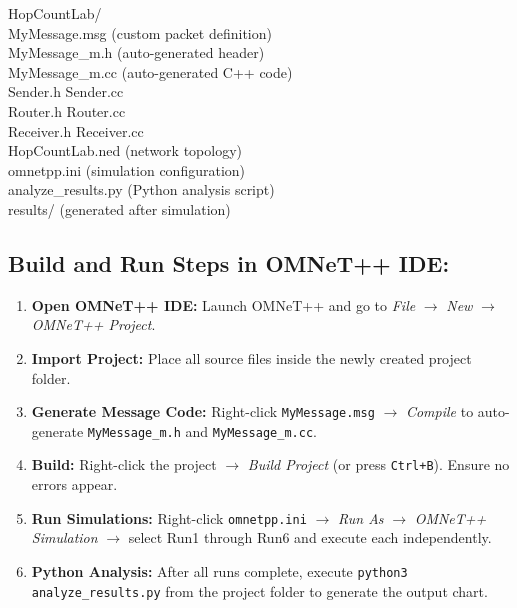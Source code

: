 \documentclass[12pt,a4paper]{article}
\begin{document}
\begin{tcolorbox}[colback=codegray, colframe=gray!50, fontupper=\ttfamily\small]
HopCountLab/ \\
\quad MyMessage.msg \quad\quad (custom packet definition) \\
\quad MyMessage\_m.h \quad\quad (auto-generated header) \\
\quad MyMessage\_m.cc \quad (auto-generated C++ code) \\
\quad Sender.h \quad\quad Sender.cc \\
\quad Router.h \quad\quad Router.cc \\
\quad Receiver.h \quad Receiver.cc \\
\quad HopCountLab.ned \quad (network topology) \\
\quad omnetpp.ini \quad\quad\quad (simulation configuration) \\
\quad analyze\_results.py \quad (Python analysis script) \\
\quad results/ \quad\quad\quad\quad\quad (generated after simulation)
\end{tcolorbox}



\subsection{Build and Run Steps in OMNeT++ IDE: }

\begin{enumerate}
  \item \textbf{Open OMNeT++ IDE:} Launch OMNeT++ and go to \textit{File} $\to$ \textit{New} $\to$ \textit{OMNeT++ Project}.
  \item \textbf{Import Project:} Place all source files inside the newly created project folder.
  \item \textbf{Generate Message Code:} Right-click \texttt{MyMessage.msg} $\to$ \textit{Compile} to auto-generate \texttt{MyMessage\_m.h} and \texttt{MyMessage\_m.cc}.
  \item \textbf{Build:} Right-click the project $\to$ \textit{Build Project} (or press \texttt{Ctrl+B}). Ensure no errors appear.
  \item \textbf{Run Simulations:} Right-click \texttt{omnetpp.ini} $\to$ \textit{Run As} $\to$ \textit{OMNeT++ Simulation} $\to$ select Run1 through Run6 and execute each independently.
  \item \textbf{Python Analysis:} After all runs complete, execute \texttt{python3 analyze\_results.py} from the project folder to generate the output chart.
\end{enumerate}
\end{document}
